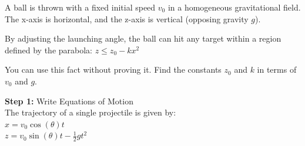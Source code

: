 \begin{minipage}{\linewidth}
\begin{tcolorbox}[
    title={IPhO 2012 Q1},
    colback=white,
    colframe=gray!50!black,
    arc=3pt,
    boxrule=1pt,
    fonttitle=\sffamily\large,
    width=\linewidth
]

    \begin{tcolorbox}[
        colback=gray!5,
        colframe=gray!20,
        coltitle=black,
        title={\small \textbf{QUESTION}},
        fontupper=\small\sffamily,
        boxrule=0.5pt,
        sharp corners,
        left=3pt, right=3pt, top=3pt, bottom=3pt
    ]
        A ball is thrown with a fixed initial speed $v_0$ in a homogeneous gravitational field. The x-axis is horizontal, and the z-axis is vertical (opposing gravity $g$). 
        \vspace{0.5em}
        
        By adjusting the launching angle, the ball can hit any target within a region defined by the parabola:
        $z \leq z_0 - k x^2$
        \vspace{0.5em}
        
        You can use this fact without proving it. Find the constants $z_0$ and $k$ in terms of $v_0$ and $g$.
    \end{tcolorbox}

    \vspace{0.5em}

    \noindent
    \begin{minipage}[t]{0.49\linewidth}
        \vspace{0pt}
        \begin{tcolorbox}[
            title={\small \textbf{BASE MODEL}},
            colframe=blue!60!white,
            colback=blue!5!white,
            coltitle=white,
            fontupper=\small\ttfamily\raggedright,
            boxrule=0.5pt,
            sharp corners,
            left=2pt, right=2pt,
            width=\linewidth,
            nobeforeafter
        ]
            \textbf{\textcolor{blue!60!black}{Step 1:}} Write Equations of Motion\\
            The trajectory of a single projectile is given by:\\
            $x = v_0 \cos(\theta) t$\\
            $z = v_0 \sin(\theta) t - \frac{1}{2} g t^2$
            \vspace{1em}
            

\end{tcolorbox}
\end{minipage}
\end{tcolorbox}
\end{minipage}
